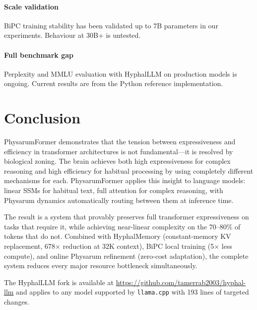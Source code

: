 \documentclass[11pt]{article}
\begin{document}
\paragraph{Scale validation} BiPC training stability has been validated up to 7B parameters in our experiments. Behaviour at 30B+ is untested.

\paragraph{Full benchmark gap} Perplexity and MMLU evaluation with HyphalLLM on production models is ongoing. Current results are from the Python reference implementation.

\section{Conclusion}
\label{sec:conclusion}

PhysarumFormer demonstrates that the tension between expressiveness and efficiency in transformer architectures is not fundamental---it is resolved by biological zoning. The brain achieves both high expressiveness for complex reasoning and high efficiency for habitual processing by using completely different mechanisms for each. PhysarumFormer applies this insight to language models: linear SSMs for habitual text, full attention for complex reasoning, with Physarum dynamics automatically routing between them at inference time.

The result is a system that provably preserves full transformer expressiveness on tasks that require it, while achieving near-linear complexity on the 70--80\% of tokens that do not. Combined with HyphalMemory (constant-memory KV replacement, 678$\times$ reduction at 32K context), BiPC local training (5$\times$ less compute), and online Physarum refinement (zero-cost adaptation), the complete system reduces every major resource bottleneck simultaneously.

The HyphalLLM fork is available at \url{https://github.com/tamerrab2003/hyphal-llm} and applies to any model supported by \texttt{llama.cpp} with 193 lines of targeted changes.
\end{document}
